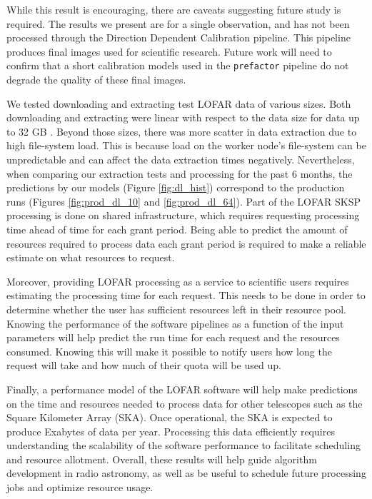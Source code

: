 \documentclass[preprint,5p]{elsarticle}
\begin{document}
While this result is encouraging, there are caveats suggesting future study is required. The results we present are for a single observation, and has not been processed through the Direction Dependent Calibration pipeline. This pipeline produces final images used for scientific research. Future work will need to confirm that a short calibration models used in the \texttt{prefactor} pipeline do not degrade the quality of these final images. 

We tested downloading and extracting test LOFAR data of various sizes. Both downloading and extracting were linear with respect to the data size for data up to 32 GB . Beyond those sizes, there was more scatter in data extraction due to high file-system load. This is because load on the worker node's file-system can be unpredictable and can affect the data extraction times negatively. Nevertheless, when comparing our extraction tests and processing for the past 6 months, the predictions by our models (Figure \ref{fig:dl_hist}) correspond to the production runs (Figures \ref{fig:prod_dl_10} and \ref{fig:prod_dl_64}).  
Part of the LOFAR SKSP processing is done on shared infrastructure, which requires requesting processing time ahead of time for each grant period. Being able to predict the amount of resources required to process data each grant period is required to make a reliable estimate on what resources to request. 

Moreover, providing LOFAR processing as a service to scientific users requires estimating the processing time for each request. This needs to be done in order to determine whether the user has sufficient resources left in their resource pool. Knowing the performance of the software pipelines as a function of the input parameters will help predict the run time for each request and the resources consumed. Knowing this will make it possible to notify users how long the request will take and how much of their quota will be used up. 

Finally, a performance model of the LOFAR software will help make predictions on the time and resources needed to process data for other telescopes such as the Square Kilometer Array (SKA). Once operational, the SKA is expected to produce Exabytes of data per year. Processing this data efficiently requires understanding the scalability of the software performance to facilitate scheduling and resource allotment. Overall, these results will help guide algorithm development in radio astronomy, as well as be useful to schedule future processing jobs and optimize resource usage. 
\end{document}
